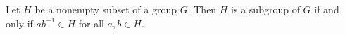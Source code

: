 \begin{theorem}
Let $H$ be a nonempty subset of a group $G$. Then $H$ is a subgroup of $G$ if and only if $ab^{-1} \in H$ for all $a,b \in H$.
\end{theorem}
